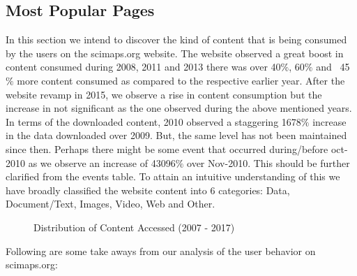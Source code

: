 \subsection{Most Popular Pages} \label{viztoppages}
In this section we intend to discover the kind of content that is being consumed by the users on the scimaps.org website. 
The website observed a great boost in content consumed during 2008, 2011 and 2013 there was over 40$\%$, 60$\%$ and ~45$\%$ more content consumed as compared to the respective earlier year. After the website revamp in 2015, we observe a rise in content consumption but the increase in not significant as the one observed during the above mentioned years. 
In terms of the downloaded content, 2010 observed a staggering 1678$\%$ increase in the data downloaded over 2009. But, the same level has not been maintained since then. Perhaps there might be some event that occurred during/before oct-2010 as we observe an increase of 43096$\%$ over Nov-2010. This should be further clarified from the events table.
To attain an intuitive understanding of this we have broadly classified the website content into 6 categories:
Data, Document/Text, Images, Video, Web and Other.
\begin{figure}
\centering
{}
\caption{Distribution of Content Accessed (2007 - 2017)}
\label{fig:TopURLs}
\end{figure}
Following are some take aways from our analysis of the user behavior on scimaps.org: 
